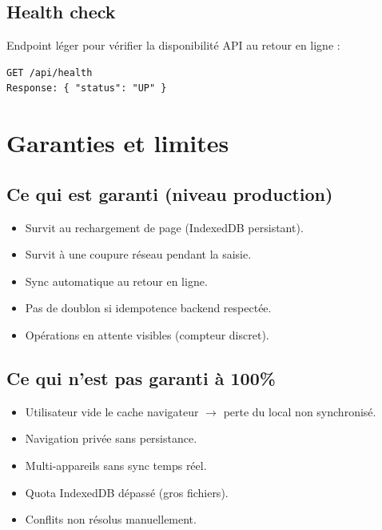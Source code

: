 \documentclass[12pt,a4paper]{report}
\begin{document}
\section{Health check}

Endpoint léger pour vérifier la disponibilité API au retour en ligne :

\begin{verbatim}
GET /api/health
Response: { "status": "UP" }
\end{verbatim}

\chapter{Garanties et limites}

\section{Ce qui est garanti (niveau production)}

\begin{itemize}
  \item Survit au rechargement de page (IndexedDB persistant).
  \item Survit à une coupure réseau pendant la saisie.
  \item Sync automatique au retour en ligne.
  \item Pas de doublon si idempotence backend respectée.
  \item Opérations en attente visibles (compteur discret).
\end{itemize}

\section{Ce qui n'est pas garanti à 100\%}

\begin{itemize}
  \item Utilisateur vide le cache navigateur $\rightarrow$ perte du local non synchronisé.
  \item Navigation privée sans persistance.
  \item Multi-appareils sans sync temps réel.
  \item Quota IndexedDB dépassé (gros fichiers).
  \item Conflits non résolus manuellement.
\end{itemize}
\end{document}
